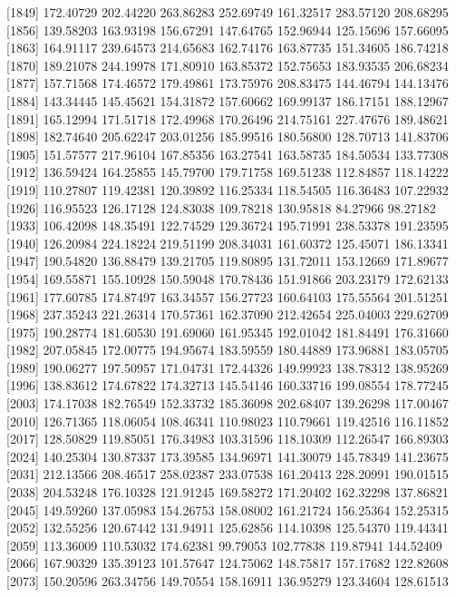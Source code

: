 \documentclass[
  10pt,
  a4paper,oneside]{article}
\begin{document}
{[}1849{]} 172.40729 202.44220 263.86283 252.69749 161.32517 283.57120 208.68295
{[}1856{]} 139.58203 163.93198 156.67291 147.64765 152.96944 125.15696 157.66095
{[}1863{]} 164.91117 239.64573 214.65683 162.74176 163.87735 151.34605 186.74218
{[}1870{]} 189.21078 244.19978 171.80910 163.85372 152.75653 183.93535 206.68234
{[}1877{]} 157.71568 174.46572 179.49861 173.75976 208.83475 144.46794 144.13476
{[}1884{]} 143.34445 145.45621 154.31872 157.60662 169.99137 186.17151 188.12967
{[}1891{]} 165.12994 171.51718 172.49968 170.26496 214.75161 227.47676 189.48621
{[}1898{]} 182.74640 205.62247 203.01256 185.99516 180.56800 128.70713 141.83706
{[}1905{]} 151.57577 217.96104 167.85356 163.27541 163.58735 184.50534 133.77308
{[}1912{]} 136.59424 164.25855 145.79700 179.71758 169.51238 112.84857 118.14222
{[}1919{]} 110.27807 119.42381 120.39892 116.25334 118.54505 116.36483 107.22932
{[}1926{]} 116.95523 126.17128 124.83038 109.78218 130.95818 84.27966 98.27182
{[}1933{]} 106.42098 148.35491 122.74529 129.36724 195.71991 238.53378 191.23595
{[}1940{]} 126.20984 224.18224 219.51199 208.34031 161.60372 125.45071 186.13341
{[}1947{]} 190.54820 136.88479 139.21705 119.80895 131.72011 153.12669 171.89677
{[}1954{]} 169.55871 155.10928 150.59048 170.78436 151.91866 203.23179 172.62133
{[}1961{]} 177.60785 174.87497 163.34557 156.27723 160.64103 175.55564 201.51251
{[}1968{]} 237.35243 221.26314 170.57361 162.37090 212.42654 225.04003 229.62709
{[}1975{]} 190.28774 181.60530 191.69060 161.95345 192.01042 181.84491 176.31660
{[}1982{]} 207.05845 172.00775 194.95674 183.59559 180.44889 173.96881 183.05705
{[}1989{]} 190.06277 197.50957 171.04731 172.44326 149.99923 138.78312 138.95269
{[}1996{]} 138.83612 174.67822 174.32713 145.54146 160.33716 199.08554 178.77245
{[}2003{]} 174.17038 182.76549 152.33732 185.36098 202.68407 139.26298 117.00467
{[}2010{]} 126.71365 118.06054 108.46341 110.98023 110.79661 119.42516 116.11852
{[}2017{]} 128.50829 119.85051 176.34983 103.31596 118.10309 112.26547 166.89303
{[}2024{]} 140.25304 130.87337 173.39585 134.96971 141.30079 145.78349 141.23675
{[}2031{]} 212.13566 208.46517 258.02387 233.07538 161.20413 228.20991 190.01515
{[}2038{]} 204.53248 176.10328 121.91245 169.58272 171.20402 162.32298 137.86821
{[}2045{]} 149.59260 137.05983 154.26753 158.08002 161.21724 156.25364 152.25315
{[}2052{]} 132.55256 120.67442 131.94911 125.62856 114.10398 125.54370 119.44341
{[}2059{]} 113.36009 110.53032 174.62381 99.79053 102.77838 119.87941 144.52409
{[}2066{]} 167.90329 135.39123 101.57647 124.75062 148.75817 157.17682 122.82608
{[}2073{]} 150.20596 263.34756 149.70554 158.16911 136.95279 123.34604 128.61513
\end{document}

